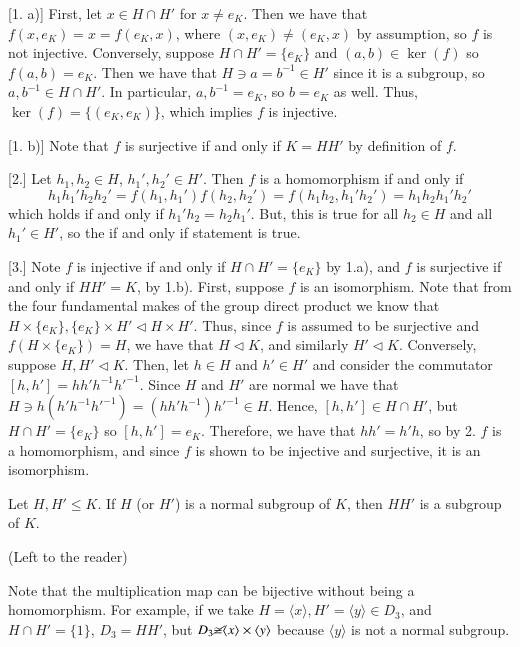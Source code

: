 \documentclass[12pt, a4paper, twoside, openright, titlepage]{book}
\begin{document}
\begin{proof*}{}{}
        [1. a)] First, let $x \in H \cap H'$ for $x \neq e_K$. Then we have that $f(x,e_K) = x = f(e_K, x)$, where $(x,e_K) \neq (e_K, x)$ by assumption, so $f$ is not injective. Conversely, suppose $H \cap H' = \{e_K\}$ and $(a,b) \in \ker(f)$ so $f(a,b) = e_K$. Then we have that $H \ni a = b^{-1} \in H'$ since it is a subgroup, so $a, b^{-1} \in H \cap H'$. In particular, $a, b^{-1} = e_K$, so $b = e_K$ as well. Thus, $\ker(f) = \{(e_K,e_K)\}$, which implies $f$ is injective.

        [1. b)] Note that $f$ is surjective if and only if $K = HH'$ by definition of $f$. 

        [2.] Let $h_1,h_2 \in H$, $h_1',h_2' \in H'$. Then $f$ is a homomorphism if and only if $$h_1h_1'h_2h_2' = f(h_1,h_1')f(h_2,h_2') = f(h_1h_2,h_1'h_2') = h_1h_2h_1'h_2'$$
        which holds if and only if $h_1'h_2 = h_2h_1'$. But, this is true for all $h_2 \in H$ and all $h_1' \in H'$, so the if and only if statement is true.

        [3.] Note $f$ is injective if and only if $H \cap H' = \{e_K\}$ by 1.a), and $f$ is surjective if and only if $HH' = K$, by 1.b). First, suppose $f$ is an isomorphism. Note that from the four fundamental makes of the group direct product we know that $H \times \{e_K\},\{e_K\}\times H' \vartriangleleft H \times H'$. Thus, since $f$ is assumed to be surjective and $f(H\times \{e_K\}) = H$, we have that $H \vartriangleleft K$, and similarly $H' \vartriangleleft K$. Conversely, suppose $H, H' \vartriangleleft K$. Then, let $h \in H$ and $h' \in H'$ and consider the commutator $[h,h'] = hh'h^{-1}{h'}^{-1}$. Since $H$ and $H'$ are normal we have that $H \ni h(h'h^{-1}{h'}^{-1}) = (hh'h^{-1}){h'}^{-1} \in H$. Hence, $[h,h'] \in H \cap H'$, but $H \cap H' = \{e_K\}$ so $[h,h'] = e_K$. Therefore, we have that $hh' = h'h$, so by 2. $f$ is a homomorphism, and since $f$ is shown to be injective and surjective, it is an isomorphism.
\end{proof*}

\begin{prop}{}{}
        Let $H,H' \leq K$. If $H$ (or $H'$) is a normal subgroup of $K$, then $HH'$ is a subgroup of $K$.
\end{prop}
\begin{proof*}{}{}
        (Left to the reader)
\end{proof*}

\begin{rmk}{}{}
        Note that the multiplication map can be bijective without being a homomorphism. For example, if we take $H = \langle x \rangle, H' = \langle y \rangle \in D_3$, and $H \cap H' = \{1\}$, $D_3 = HH'$, but $D_3 \cancel{\cong}\langle x \rangle \times \langle y \rangle$ because $\langle y \rangle $ is not a normal subgroup.
\end{rmk}
\end{document}
